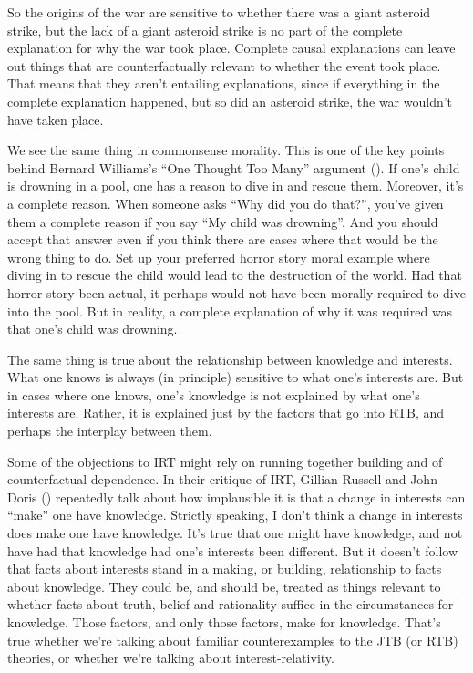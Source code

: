 \documentclass[
  10pt,
  letterpaper,
  twoside]{scrbook}
\begin{document}
So the origins of the war are sensitive to whether there was a giant
asteroid strike, but the lack of a giant asteroid strike is no part of
the complete explanation for why the war took place. Complete causal
explanations can leave out things that are counterfactually relevant to
whether the event took place. That means that they aren't entailing
explanations, since if everything in the complete explanation happened,
but so did an asteroid strike, the war wouldn't have taken place.

We see the same thing in commonsense morality. This is one of the key
points behind Bernard Williams's ``One Thought Too Many'' argument
(). If one's child is
drowning in a pool, one has a reason to dive in and rescue them.
Moreover, it's a complete reason. When someone asks ``Why did you do
that?'', you've given them a complete reason if you say ``My child was
drowning''. And you should accept that answer even if you think there
are cases where that would be the wrong thing to do. Set up your
preferred horror story moral example where diving in to rescue the child
would lead to the destruction of the world. Had that horror story been
actual, it perhaps would not have been morally required to dive into the
pool. But in reality, a complete explanation of why it was required was
that one's child was drowning.

The same thing is true about the relationship between knowledge and
interests. What one knows is always (in principle) sensitive to what
one's interests are. But in cases where one knows, one's knowledge is
not explained by what one's interests are. Rather, it is explained just
by the factors that go into RTB, and perhaps the interplay between them.

Some of the objections to IRT might rely on running together building
and of counterfactual dependence. In their critique of IRT, Gillian
Russell and John Doris ()
repeatedly talk about how implausible it is that a change in interests
can ``make'' one have knowledge. Strictly speaking, I don't think a
change in interests does make one have knowledge. It's true that one
might have knowledge, and not have had that knowledge had one's
interests been different. But it doesn't follow that facts about
interests stand in a making, or building, relationship to facts about
knowledge. They could be, and should be, treated as things relevant to
whether facts about truth, belief and rationality suffice in the
circumstances for knowledge. Those factors, and only those factors, make
for knowledge. That's true whether we're talking about familiar
counterexamples to the JTB (or RTB) theories, or whether we're talking
about interest-relativity.
\end{document}
